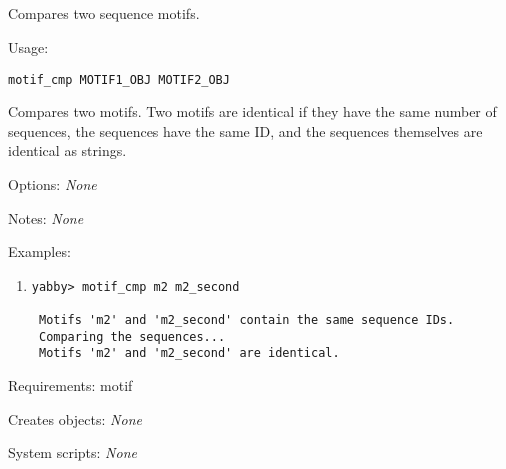 

\subsection[motif\_cmp]{  }



Compares two sequence motifs.


\begin{description}


\item{Usage:}

{\tt motif\_cmp MOTIF1\_OBJ MOTIF2\_OBJ}

 Compares two motifs.  Two motifs are identical if they have
 the same number of sequences, the sequences have the same
 ID, and the sequences themselves are identical as strings.


\item{Options:} {\em None}


\item{Notes:} {\em None}


\item{Examples:}
\begin{enumerate}

\item
\begin{verbatim}
yabby> motif_cmp m2 m2_second

 Motifs 'm2' and 'm2_second' contain the same sequence IDs.
 Comparing the sequences...
 Motifs 'm2' and 'm2_second' are identical.

\end{verbatim}

\end{enumerate}


\item{Requirements:} motif


\item{Creates objects:} {\em None}


\item{System scripts:} {\em None}

\end{description}

